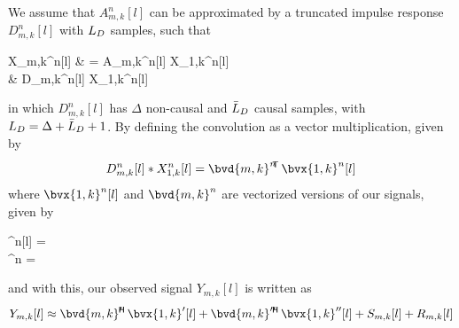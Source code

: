 %	
We assume that $A_{m,k}^n[l]$ can be approximated by a truncated impulse response $D_{m,k}^n[l]$ with $\Ld$ samples, such that
\begin{equations}
	X_{m,k}^n[l]
	& = A_{m,k}^n[l] \ast X_{1,k}^n[l] \\
	& \approx D_{m,k}^n[l] \ast X_{1,k}^n[l]
\end{equations}
in which $D_{m,k}^n[l]$ has $\Delta$ non-causal and $\Ld*$ causal samples, with $\Ld = \Delta + \Ld* + 1$. By defining the convolution as a vector multiplication, given by
\begin{equation}
	D_{m,k}^n[l] \ast X_{1,k}^n[l] = \tr*{\bvd{m,k}^n} \bvx{1,k}^n[l]
\end{equation}
where $\bvx{1,k}^n[l]$ and $\bvd{m,k}^n$ are vectorized versions of our signals, given by
\begin{subgather}
	^n[l] =  \\
	^n =  
\end{subgather}
and with this, our observed signal $Y_{m,k}[l]$ is written as
\begin{equation}
	Y_{m,k}[l] \approx \he*{\bvd{m,k}'} \bvx{1,k}'[l] + \he*{\bvd{m,k}''} \bvx{1,k}''[l] + S_{m,k}[l] + R_{m,k}[l]
\end{equation}

